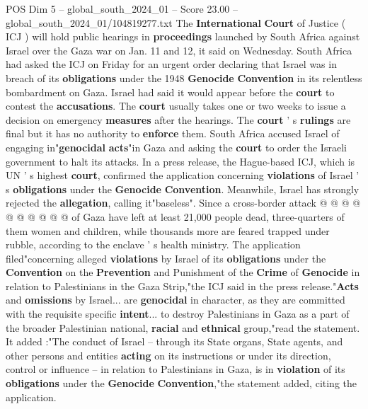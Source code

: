 \begin{textsample}{POS Dim 5 – global\_south\_2024\_01 – Score 23.00 – global\_south\_2024\_01/104819277.txt}  \label{ex:f5_pos_004}
The \textbf{International} \textbf{Court} of Justice ( ICJ ) will hold public hearings in \textbf{proceedings} launched by South Africa against Israel over the Gaza war on Jan. 11 and 12, it said on Wednesday.
South Africa had asked the ICJ on Friday for an urgent order declaring that Israel was in breach of its \textbf{obligations} under the 1948 \textbf{Genocide} \textbf{Convention} in its relentless bombardment on Gaza.
Israel had said it would appear before the \textbf{court} to contest the \textbf{accusations}.
The \textbf{court} usually takes one or two weeks to issue a decision on emergency \textbf{measures} after the hearings.
The \textbf{court} ' s \textbf{rulings} are final but it has no authority to \textbf{enforce} them.
South Africa accused Israel of engaging in"\textbf{genocidal} \textbf{acts}"in Gaza and asking the \textbf{court} to order the Israeli government to halt its attacks.
In a press release, the Hague-based ICJ, which is UN ' s highest \textbf{court}, confirmed the application concerning \textbf{violations} of Israel ' s \textbf{obligations} under the \textbf{Genocide} \textbf{Convention}.
Meanwhile, Israel has strongly rejected the \textbf{allegation}, calling it"baseless".
Since a cross-border attack @ @ @ @ @ @ @ @ @ @ of Gaza have left at least 21,000 people dead, three-quarters of them women and children, while thousands more are feared trapped under rubble, according to the enclave ' s health ministry.
The application filed"concerning alleged \textbf{violations} by Israel of its \textbf{obligations} under the \textbf{Convention} on the \textbf{Prevention} and Punishment of the \textbf{Crime} of \textbf{Genocide} in relation to Palestinians in the Gaza Strip,"the ICJ said in the press release."\textbf{Acts} and \textbf{omissions} by Israel... are \textbf{genocidal} in character, as they are committed with the requisite specific \textbf{intent}... to destroy Palestinians in Gaza as a part of the broader Palestinian national, \textbf{racial} and \textbf{ethnical} group,"read the statement.
It added :"The conduct of Israel -- through its State organs, State agents, and other persons and entities \textbf{acting} on its instructions or under its direction, control or influence -- in relation to Palestinians in Gaza, is in \textbf{violation} of its \textbf{obligations} under the \textbf{Genocide} \textbf{Convention},"the statement added, citing the application.

\end{textsample}
